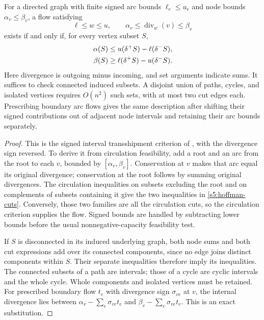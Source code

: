 \begin{lemma}\label{s5:cuts}
For a directed graph with finite signed arc bounds $\ell_e\le u_e$
and node bounds $\alpha_v\le\beta_v$, a flow satisfying
\[
 \ell\le w\le u,\qquad
 \alpha_v\le\operatorname{div}_w(v)\le\beta_v
\]
exists if and only if, for every vertex subset $S$,
\begin{align}
 \alpha(S)&\le u(\delta^+S)-\ell(\delta^-S),\notag\\
 \beta(S)&\ge \ell(\delta^+S)-u(\delta^-S).
 \label{s5:hoffman-cuts}
\end{align}
Here divergence is outgoing minus incoming, and set arguments indicate
sums. It suffices to check connected induced subsets. A disjoint union
of paths, cycles, and isolated vertices requires $O(n^2)$ such sets,
with at most two cut edges each. Prescribing boundary arc flows gives
the same description after shifting their signed contributions out of
adjacent node intervals and retaining their arc bounds separately.
\end{lemma}
\begin{proof}
This is the signed interval transshipment criterion of
\citet[Corollary~11.2i, p.~175]{s5:schrijver2003}, with the divergence
sign reversed. To derive it from circulation feasibility, add a root
and an arc from the root to each $v$, bounded by
$[\alpha_v,\beta_v]$. Conservation at $v$ makes that arc equal its
original divergence; conservation at the root follows by summing
original divergences. The circulation inequalities on subsets excluding
the root and on complements of subsets containing it give the two
inequalities in \eqref{s5:hoffman-cuts}. Conversely, those two families
are all the circulation cuts, so the circulation criterion supplies the
flow. Signed bounds are handled by subtracting lower bounds before
the usual nonnegative-capacity feasibility test.

If $S$ is disconnected in its induced underlying graph, both node sums
and both cut expressions add over its connected components, since no
edge joins distinct components within $S$. Their separate inequalities
therefore imply its inequalities. The connected subsets of a path are
intervals; those of a cycle are cyclic intervals and the whole cycle.
Whole components and isolated vertices must be retained. For prescribed
boundary flow $t_e$ with divergence sign $\sigma_{ve}$ at $v$, the
internal divergence lies between
$\alpha_v-\sum_e\sigma_{ve}t_e$ and
$\beta_v-\sum_e\sigma_{ve}t_e$. This is an exact substitution.
\end{proof}

